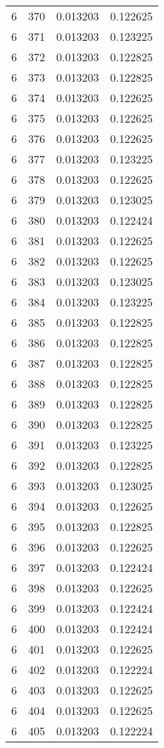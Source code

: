 \begin{longtable}{rrrr}
6 & 370 & 0.013203 & 0.122625 \\
6 & 371 & 0.013203 & 0.123225 \\
6 & 372 & 0.013203 & 0.122825 \\
6 & 373 & 0.013203 & 0.122825 \\
6 & 374 & 0.013203 & 0.122625 \\
6 & 375 & 0.013203 & 0.122625 \\
6 & 376 & 0.013203 & 0.122625 \\
6 & 377 & 0.013203 & 0.123225 \\
6 & 378 & 0.013203 & 0.122625 \\
6 & 379 & 0.013203 & 0.123025 \\
6 & 380 & 0.013203 & 0.122424 \\
6 & 381 & 0.013203 & 0.122625 \\
6 & 382 & 0.013203 & 0.122625 \\
6 & 383 & 0.013203 & 0.123025 \\
6 & 384 & 0.013203 & 0.123225 \\
6 & 385 & 0.013203 & 0.122825 \\
6 & 386 & 0.013203 & 0.122825 \\
6 & 387 & 0.013203 & 0.122825 \\
6 & 388 & 0.013203 & 0.122825 \\
6 & 389 & 0.013203 & 0.122825 \\
6 & 390 & 0.013203 & 0.122825 \\
6 & 391 & 0.013203 & 0.123225 \\
6 & 392 & 0.013203 & 0.122825 \\
6 & 393 & 0.013203 & 0.123025 \\
6 & 394 & 0.013203 & 0.122625 \\
6 & 395 & 0.013203 & 0.122825 \\
6 & 396 & 0.013203 & 0.122625 \\
6 & 397 & 0.013203 & 0.122424 \\
6 & 398 & 0.013203 & 0.122625 \\
6 & 399 & 0.013203 & 0.122424 \\
6 & 400 & 0.013203 & 0.122424 \\
6 & 401 & 0.013203 & 0.122625 \\
6 & 402 & 0.013203 & 0.122224 \\
6 & 403 & 0.013203 & 0.122625 \\
6 & 404 & 0.013203 & 0.122625 \\
6 & 405 & 0.013203 & 0.122224 \\

\end{longtable}
